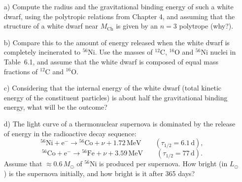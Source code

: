 \documentclass[a4paper,11pt]{article}
\newcommand{\Msun}{\ensuremath{{M}_\odot}}
\newcommand{\Lsun}{\ensuremath{{L}_\odot}}
\newcommand{\el}[2]{\ensuremath{{^{#2}\mathrm{#1}}}}
\newcommand{\e}{\ensuremath{\mathrm{e}}}
\begin{document}
\begin{enumerate}

\item[a)] Compute the radius and the gravitational binding energy of such a white dwarf, using the polytropic relations from Chapter 4, and assuming that the structure of a white dwarf near $M_\mathrm{Ch}$ is given by an $n = 3$ polytrope (why?).

\item[b)] Compare this to the amount of energy released when the white dwarf is completely incinerated to $^{56}$Ni. Use the masses of $^{12}$C, $^{16}$O and $^{56}$Ni nuclei in Table~6.1, and assume that the white dwarf is 
composed of equal mass fractions of $^{12}$C and $^{16}$O.

\item[c)] Considering that the internal energy of the white dwarf (total kinetic energy of the constituent particles) is about half the gravitational binding energy, what will be the outcome?

\item[d)] The light curve of a thermonuclear supernova is dominated by
the release of energy in the radioactive decay sequence:
    \[
    \el{Ni}{56} + \e^- \rightarrow \el{Co}{56} + \nu +
    1.72\,\mathrm{MeV} \qquad (\tau_{1/2} = 6.1\,\mathrm{d}),
    \]
    \[
    \el{Co}{56} + \e^- \rightarrow \el{Fe}{56} + \nu +
    3.59\,\mathrm{MeV} \qquad (\tau_{1/2} = 77\,\mathrm{d}).
    \]
Assume that $\approx 0.6\,\Msun$ of \el{Ni}{56} is produced per
supernova. How bright (in \Lsun) is the supernova initially, and
how bright is it after 365 days?


\end{enumerate} 
            
\end{document}
